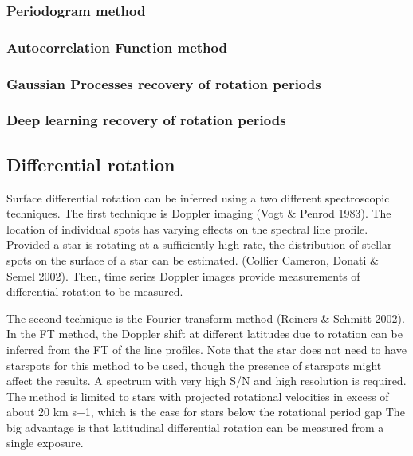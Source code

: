 \subsubsection{Periodogram method}




\subsubsection{Autocorrelation Function method}

\subsubsection{Gaussian Processes recovery of rotation periods}


\subsubsection{Deep learning recovery of rotation periods}


\subsection{Differential rotation}
Surface differential rotation can be inferred using a two different spectroscopic techniques. 
The first technique is Doppler imaging (Vogt & Penrod 1983).
The location of individual spots has varying effects on the spectral line profile.
Provided a star is rotating at a sufficiently high rate, the distribution of stellar spots on the surface of a star can be estimated. (Collier Cameron, Donati & Semel 2002). 
Then, time series Doppler images provide measurements of differential rotation to be measured.

The second technique is the Fourier transform method (Reiners & Schmitt 2002). In the
FT method, the Doppler shift at different latitudes due to rotation
can be inferred from the FT of the line profiles. Note that the star
does not need to have starspots for this method to be used, though
the presence of starspots might affect the results. A spectrum with
very high S/N and high resolution is required. The method is limited to stars with projected rotational velocities in excess of about
20 km s−1, which is the case for stars below the rotational period gap The big advantage is that latitudinal differential rotation
can be measured from a single exposure. 

% 

